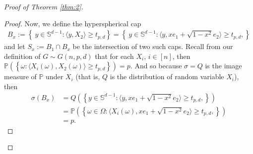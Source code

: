 \documentclass{article}
\begin{document}
\begin{proof}[Proof of Theorem \ref{thm:2}]
\begin{proof}
Now, we define the hyperspherical cap
\begin{align}
    B_x := \left\{\ y \in \mathbb{S}^{d-1}: \langle y, X_2 \rangle \geq t_{p,d} \right\} = \left\{\ y \in \mathbb{S}^{d-1}: \langle y, xe_1 + \sqrt{1-x^2}e_2 \rangle \geq t_{p,d}, \right\}\label{eq11}
\end{align}
and let $S_x := B_1 \cap B_x$ be the intersection of two such caps. Recall from our definition of $G \sim G(n,p,d)$ that for each $X_i$, $i \in [n]$, then $\mathbb{P}(\left\{ \omega: \langle X_i(\omega), X_2(\omega) \rangle \geq t_{p,d} \right\})  = p$. And so because $\sigma = Q$ is the image measure of $\mathbb{P}$ under $X_i$ (that is, $Q$ is the distribution of random variable $X_i$), then
\begin{align*}
    \sigma(B_{x}) &= Q\left(\left\{ y \in \mathbb{S}^{d-1}: \langle y, xe_1 + \sqrt{1-x^2}e_2 \rangle \geq t_{p,d}, \right\} \right)\\
    &= \mathbb{P}\left( \left\{ \omega \in \Omega: \langle X_i(\omega), xe_1 + \sqrt{1-x^2}e_2 \rangle \geq t_{p,d}, \right\} \right)\\
    &=p.
\end{align*}


\end{proof}
\end{proof}
\end{document}
